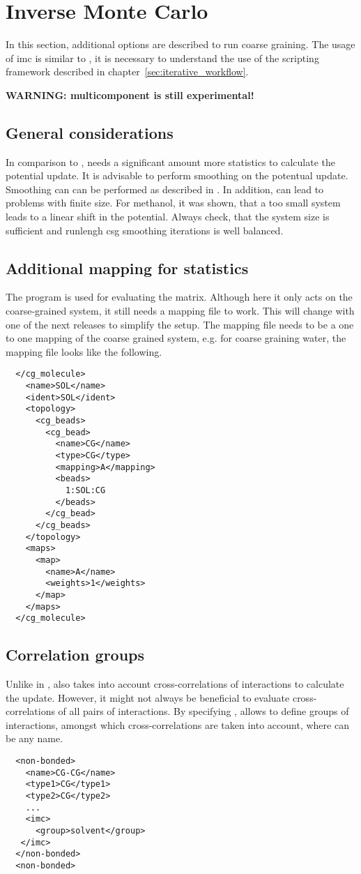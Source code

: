 \chapter{Inverse Monte Carlo}
In this section, additional options are described to run \imc coarse graining. The usage of imc is similar to \ibi, it is necessary to understand the use of the scripting framework described in chapter~\ref{sec:iterative_workflow}.

\textbf{WARNING: multicomponent \imc is still experimental!}

\section{General considerations}
In comparison to \ibi, \imc needs a significant amount more statistics to calculate the potential update\cite{Ruehle:2009.a}. It is advisable to perform smoothing on the potentual update. Smoothing can can be performed as described in . In addition, \imc can lead to problems with finite size. For methanol, it was shown, that a too small system leads to a linear shift in the potential\cite{Ruehle:2009.a}. Always check, that the system size is sufficient and runlengh csg smoothing iterations is well balanced.

\section{Additional mapping for statistics}
The program  is used for evaluating the \imc matrix. Although here it only acts on the coarse-grained system, it still needs a mapping file to work. This will change with one of the next releases to simplify the setup. The mapping file needs to be a one to one mapping of the coarse grained system, e.g. for coarse graining \spce water, the mapping file looks like the following.
\begin{lstlisting}
  </cg_molecule>
    <name>SOL</name> 
    <ident>SOL</ident>
    <topology>
      <cg_beads>
        <cg_bead>
          <name>CG</name>
          <type>CG</type>
          <mapping>A</mapping>
          <beads>
            1:SOL:CG 
          </beads>
        </cg_bead>
      </cg_beads>
    </topology>
    <maps>
      <map>
        <name>A</name>
        <weights>1</weights>
      </map>
    </maps>
  </cg_molecule>
\end{lstlisting}



\section{Correlation groups}
Unlike in \ibi, \imc also takes into account cross-correlations of interactions to calculate the update. However, it might not always be beneficial to evaluate cross-correlations of all pairs of interactions. By specifying , \votca allows to define groups of interactions, amongst which cross-correlations are taken into account, where  can be any name.

\begin{lstlisting}
  <non-bonded>
    <name>CG-CG</name>
    <type1>CG</type1>
    <type2>CG</type2>
    ...
    <imc>
      <group>solvent</group>
   </imc>
  </non-bonded>
  <non-bonded>
\end{lstlisting}
